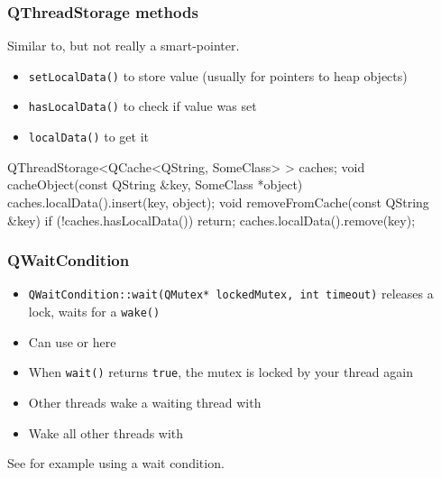 \begin{slide}[fragile]
\frametitle{QThreadStorage methods}
Similar to, but not really a smart-pointer.
\begin{itemize}
\item \texttt{setLocalData()} to store value (usually for pointers to heap
    objects)
\item \texttt{hasLocalData()} to check if value was set
\item \texttt{localData()} to get it
\end{itemize}
\begin{cpp}
QThreadStorage<QCache<QString, SomeClass> > caches;
void cacheObject(const QString &key, SomeClass *object) {
    caches.localData().insert(key, object);
}
void removeFromCache(const QString &key) {
    if (!caches.hasLocalData())
        return;
    caches.localData().remove(key);
}
\end{cpp}
\end{slide}

\begin{slide}[fragile]
\frametitle{QWaitCondition}
\begin{itemize}
\item \texttt{QWaitCondition::wait(QMutex* lockedMutex, int timeout)} releases a
lock, waits for a \texttt{wake()}
\item Can use  or  here
\item When \texttt{wait()} returns \texttt{true}, the mutex is locked by your
thread again
\item Other threads wake a waiting thread with 
\item Wake all other threads with 
\end{itemize}
See  for example using a wait
condition.
\end{slide}


